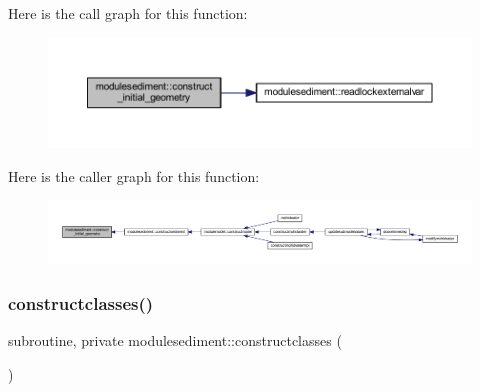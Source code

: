 Here is the call graph for this function\+:\nopagebreak
\begin{figure}[H]
\begin{center}
\leavevmode
\includegraphics[width=350pt]{namespacemodulesediment_adb9b138d3feb285796bc8580b24509db_cgraph}
\end{center}
\end{figure}
Here is the caller graph for this function\+:\nopagebreak
\begin{figure}[H]
\begin{center}
\leavevmode
\includegraphics[width=350pt]{namespacemodulesediment_adb9b138d3feb285796bc8580b24509db_icgraph}
\end{center}
\end{figure}
\mbox{\label{namespacemodulesediment_aab617a4a3f8db9a8c86241473054067d}} 
\subsubsection{\texorpdfstring{constructclasses()}{constructclasses()}}
{\footnotesize\ttfamily subroutine, private modulesediment\+::constructclasses (\begin{DoxyParamCaption}{ }\end{DoxyParamCaption})\hspace{0.3cm}{\ttfamily [private]}}

